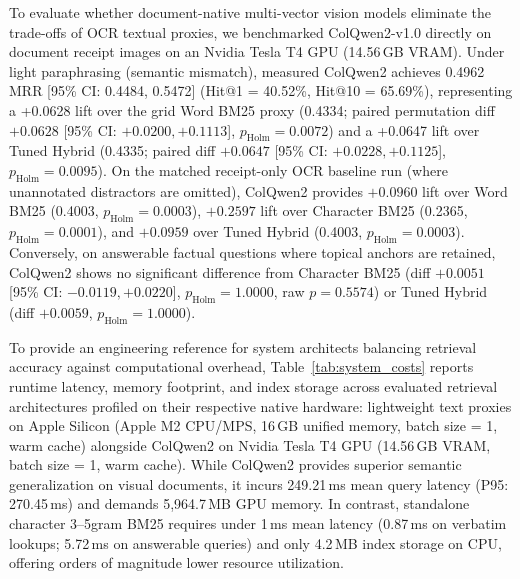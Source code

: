 \documentclass[conference]{IEEEtran}
\begin{document}
To evaluate whether document-native multi-vector vision models eliminate the trade-offs of OCR textual proxies, we benchmarked ColQwen2-v1.0 \cite{faysse2024colqwen2} directly on document receipt images on an Nvidia Tesla T4 GPU (14.56\,GB VRAM). Under light paraphrasing (semantic mismatch), measured ColQwen2 achieves 0.4962 MRR [95\% CI: 0.4484, 0.5472] (Hit@1 = 40.52\%, Hit@10 = 65.69\%), representing a +0.0628 lift over the grid Word BM25 proxy (0.4334; paired permutation diff $+0.0628$ [95\% CI: $+0.0200, +0.1113$], $p_{\text{Holm}} = 0.0072$) and a +0.0647 lift over Tuned Hybrid (0.4335; paired diff $+0.0647$ [95\% CI: $+0.0228, +0.1125$], $p_{\text{Holm}} = 0.0095$). On the matched receipt-only OCR baseline run (where unannotated distractors are omitted), ColQwen2 provides $+0.0960$ lift over Word BM25 (0.4003, $p_{\text{Holm}} = 0.0003$), $+0.2597$ lift over Character BM25 (0.2365, $p_{\text{Holm}} = 0.0001$), and $+0.0959$ over Tuned Hybrid (0.4003, $p_{\text{Holm}} = 0.0003$). Conversely, on answerable factual questions where topical anchors are retained, ColQwen2 shows no significant difference from Character BM25 (diff $+0.0051$ [95\% CI: $-0.0119, +0.0220$], $p_{\text{Holm}} = 1.0000$, raw $p = 0.5574$) or Tuned Hybrid (diff $+0.0059$, $p_{\text{Holm}} = 1.0000$).

To provide an engineering reference for system architects balancing retrieval accuracy against computational overhead, Table~\ref{tab:system_costs} reports runtime latency, memory footprint, and index storage across evaluated retrieval architectures profiled on their respective native hardware: lightweight text proxies on Apple Silicon (Apple M2 CPU/MPS, 16\,GB unified memory, batch size = 1, warm cache) alongside ColQwen2 on Nvidia Tesla T4 GPU (14.56\,GB VRAM, batch size = 1, warm cache). While ColQwen2 provides superior semantic generalization on visual documents, it incurs 249.21\,ms mean query latency (P95: 270.45\,ms) and demands 5,964.7\,MB GPU memory. In contrast, standalone character 3--5gram BM25 requires under 1\,ms mean latency (0.87\,ms on verbatim lookups; 5.72\,ms on answerable queries) and only 4.2\,MB index storage on CPU, offering orders of magnitude lower resource utilization.
\end{document}
